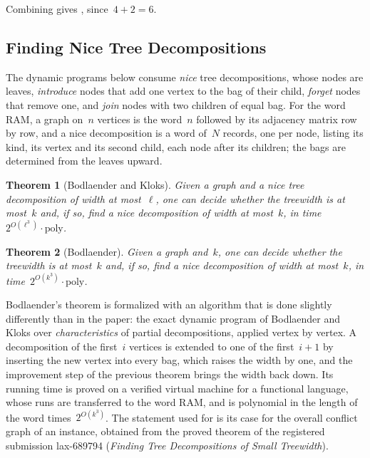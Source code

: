 \documentclass[11pt,a4paper]{article}
\newtheorem*{supportingtheorem}{Theorem}
\theoremstyle{definition}
\newcommand{\bigO}{O}
\begin{document}


Combining  gives , since~$4+2=6$.

\subsection{Finding Nice Tree Decompositions}

The dynamic programs below consume \emph{nice} tree decompositions, whose nodes are leaves,
\emph{introduce} nodes that add one vertex to the bag of their child, \emph{forget} nodes that
remove one, and \emph{join} nodes with two children of equal bag.
For the word RAM, a graph on~$n$ vertices is the word~$n$ followed by its adjacency matrix row
by row, and a nice decomposition is a word of~$N$ records, one per node, listing its kind, its
vertex and its second child, each node after its children; the bags are determined from the
leaves upward.

\begin{supportingtheorem}[Bodlaender and Kloks]
Given a graph and a nice tree decomposition of width at most~$\ell$, one can decide whether
the treewidth is at most~$k$ and, if so, find a nice decomposition of width at most~$k$, in
time~$2^{\bigO(\ell^3)}\cdot\mathrm{poly}$.
\end{supportingtheorem}

\begin{supportingtheorem}[Bodlaender]
Given a graph and~$k$, one can decide whether the treewidth is at most~$k$ and, if so, find a
nice decomposition of width at most~$k$, in time~$2^{\bigO(k^3)}\cdot\mathrm{poly}$.
\end{supportingtheorem}
Bodlaender's theorem is formalized with an algorithm that is done slightly differently than
in the paper: the exact dynamic program of Bodlaender and Kloks over \emph{characteristics} of
partial decompositions, applied vertex by vertex. A decomposition of the first~$i$ vertices
is extended to one of the first~$i+1$ by inserting the new vertex into every bag, which raises
the width by one, and the improvement step of the previous theorem brings the width back down.
Its running time is proved on a verified virtual machine for a functional language, whose
runs are transferred to the word RAM, and is polynomial in the length of the word times~$2^{\bigO(k^3)}$. The statement used for  is its case for the overall conflict
graph of an instance, obtained from the proved theorem of the registered submission lax-689794 (\emph{Finding Tree Decompositions of Small Treewidth}).
\end{document}
